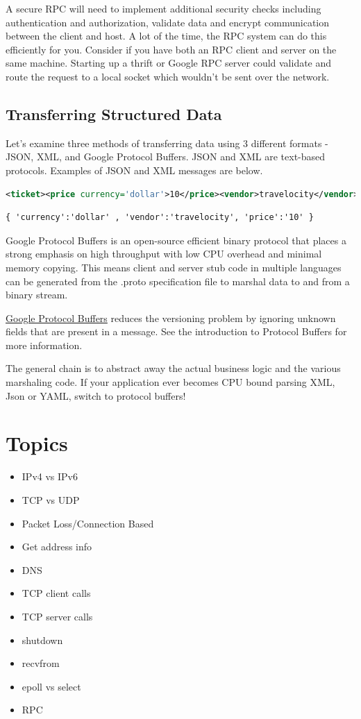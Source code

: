 A secure RPC will need to implement additional security checks including authentication and authorization, validate data and encrypt communication between the client and host.
A lot of the time, the RPC system can do this efficiently for you. Consider if you have both an RPC client and server on the same machine.
Starting up a thrift or Google RPC server could validate and route the request to a local socket which wouldn't be sent over the network.

\subsection{Transferring Structured Data}

Let's examine three methods of transferring data using 3 different formats - JSON, XML, and Google Protocol Buffers.
JSON and XML are text-based protocols.
Examples of JSON and XML messages are below.

\begin{lstlisting}[language=XML]
<ticket><price currency='dollar'>10</price><vendor>travelocity</vendor></ticket>
\end{lstlisting}

\begin{lstlisting}
{ 'currency':'dollar' , 'vendor':'travelocity', 'price':'10' }
\end{lstlisting}

Google Protocol Buffers is an open-source efficient binary protocol that places a strong emphasis on high throughput with low CPU overhead and minimal memory copying.
This means client and server stub code in multiple languages can be generated from the .proto specification file to marshal data to and from a binary stream.

\href{https://developers.google.com/protocol-buffers/docs/overview}{Google Protocol Buffers} reduces the versioning problem by ignoring unknown fields that are present in a message.
See the introduction to Protocol Buffers for more information.

The general chain is to abstract away the actual business logic and the various marshaling code.
If your application ever becomes CPU bound parsing XML, Json or YAML, switch to protocol buffers!

\section{Topics}

\begin{itemize}
\item
  IPv4 vs IPv6
\item
  TCP vs UDP
\item
  Packet Loss/Connection Based
\item
  Get address info
\item
  DNS
\item
  TCP client calls
\item
  TCP server calls
\item
  shutdown
\item
  recvfrom
\item
  epoll vs select
\item
  RPC
\end{itemize}

